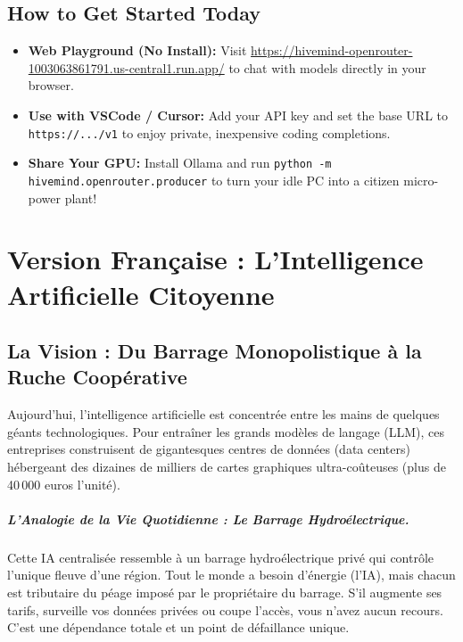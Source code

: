 \documentclass[11pt,a4paper]{report}
\begin{document}
\section{How to Get Started Today}
\begin{itemize}[leftmargin=1.8em]
    \item \textbf{Web Playground (No Install):} Visit \url{https://hivemind-openrouter-1003063861791.us-central1.run.app/} to chat with models directly in your browser.
    \item \textbf{Use with VSCode / Cursor:} Add your API key and set the base URL to \texttt{https://.../v1} to enjoy private, inexpensive coding completions.
    \item \textbf{Share Your GPU:} Install Ollama and run \texttt{python -m hivemind.openrouter.producer} to turn your idle PC into a citizen micro-power plant!
\end{itemize}

\newpage

\chapter{Version Française : L'Intelligence Artificielle Citoyenne}
\label{chap:fr}

\section{La Vision : Du Barrage Monopolistique à la Ruche Coopérative}

Aujourd'hui, l'intelligence artificielle est concentrée entre les mains de quelques géants technologiques. Pour entraîner les grands modèles de langage (LLM), ces entreprises construisent de gigantesques centres de données (data centers) hébergeant des dizaines de milliers de cartes graphiques ultra-coûteuses (plus de 40\,000 euros l'unité).

\paragraph{L'Analogie de la Vie Quotidienne : Le Barrage Hydroélectrique.}
Cette IA centralisée ressemble à un barrage hydroélectrique privé qui contrôle l'unique fleuve d'une région. Tout le monde a besoin d'énergie (l'IA), mais chacun est tributaire du péage imposé par le propriétaire du barrage. S'il augmente ses tarifs, surveille vos données privées ou coupe l'accès, vous n'avez aucun recours. C'est une dépendance totale et un point de défaillance unique.
\end{document}
